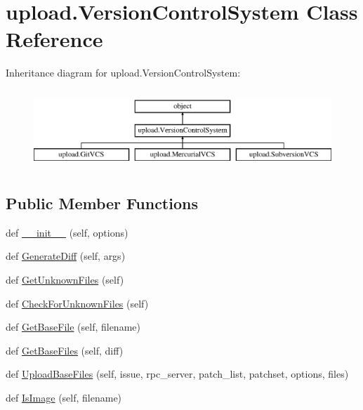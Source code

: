 \hypertarget{classupload_1_1_version_control_system}{}\section{upload.\+Version\+Control\+System Class Reference}
\label{classupload_1_1_version_control_system}
Inheritance diagram for upload.\+Version\+Control\+System\+:\begin{figure}[H]
\begin{center}
\leavevmode
\includegraphics[height=2.994653cm]{classupload_1_1_version_control_system}
\end{center}
\end{figure}
\subsection*{Public Member Functions}
\begin{DoxyCompactItemize}
\item 
def \mbox{\hyperlink{classupload_1_1_version_control_system_ace97e5785a2b40011404ae6fbb956ecf}{\+\_\+\+\_\+init\+\_\+\+\_\+}} (self, options)
\item 
def \mbox{\hyperlink{classupload_1_1_version_control_system_aa5eb260c96e7016dab36b5fc136c9f49}{Generate\+Diff}} (self, args)
\item 
def \mbox{\hyperlink{classupload_1_1_version_control_system_a56a60e56aa9aff3df4001d2f84cab884}{Get\+Unknown\+Files}} (self)
\item 
def \mbox{\hyperlink{classupload_1_1_version_control_system_ad2923d691a1b1047e9359c5b7c1c103f}{Check\+For\+Unknown\+Files}} (self)
\item 
def \mbox{\hyperlink{classupload_1_1_version_control_system_adfd9d4ecba422102233a2ba13e5bfaf5}{Get\+Base\+File}} (self, filename)
\item 
def \mbox{\hyperlink{classupload_1_1_version_control_system_a812c3b3daf90c88b015fa4b26252e291}{Get\+Base\+Files}} (self, diff)
\item 
def \mbox{\hyperlink{classupload_1_1_version_control_system_a7e334f967301b9e85e5a9c39f5036823}{Upload\+Base\+Files}} (self, issue, rpc\+\_\+server, patch\+\_\+list, patchset, options, files)
\item 
def \mbox{\hyperlink{classupload_1_1_version_control_system_a846889ecd2ef40870b456ddb5b349e02}{Is\+Image}} (self, filename)
\end{DoxyCompactItemize}
